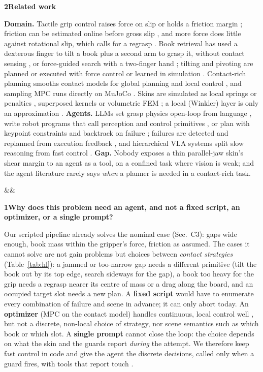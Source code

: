 \documentclass[10pt]{article}
\newcommand{\tplsec}[3]{\par\vspace{7pt}\noindent\colorbox{tplband}{\parbox{\dimexpr\linewidth-2\fboxsep}{%
  \vspace{2pt}{\color{tplorange}\large\bfseries #1}\hspace{0.5em}{\large\bfseries #2}%
  \ifx&#3&\else\\[-1pt]{\small\itshape\color{ink2}#3}\fi\vspace{2pt}}}\par\vspace{3pt}}
\newcommand{\tplq}[2]{\par\vspace{3pt}\noindent\colorbox{tplrow}{\parbox{\dimexpr\linewidth-2\fboxsep}{%
  {\color{tplorange}\bfseries #1}\hspace{0.45em}\textbf{#2}}}\par\vspace{1pt}}
\begin{document}
\tplq{2}{Related work}
\textbf{Domain.} Tactile grip control raises force on slip or holds a friction margin
\cite{romano2011,dong2017,dong2019maintaining,su2015force}; friction can be estimated online before gross slip
\cite{khamis2021friction}, and more force does little against rotational slip, which calls for a regrasp
\cite{kolamuri2021rotation}. Book retrieval has used a dexterous finger to tilt a book plus a second arm to grasp it,
without contact sensing \cite{wieczorek2022trixi}, or force-guided search with a two-finger hand \cite{prats2008uji};
tilting and pivoting are planned or executed with force control \cite{hou2019pivot,hou2019hybrid} or learned in
simulation \cite{zhou2022ungraspable}. Contact-rich planning smooths contact models for global planning and local
control \cite{pang2023tro,suh2025ctr,suh2025thesis}, and sampling MPC runs directly on MuJoCo
\cite{howell2022mjpc,li2025judo}. Skins are simulated as local springs or penalties \cite{tacsl2025,elandt2019},
superposed kernels \cite{taxim2021} or volumetric FEM \cite{difftactile2024}; a local (Winkler) layer is only an
approximation \cite{johnson1985,chandler_vella2020}.
\textbf{Agents.} LLMs set grasp physics open-loop from language \cite{xie2024deligrasp}, write robot programs that call
perception and control primitives \cite{liang2023cap}, or plan with keypoint constraints and backtrack on failure
\cite{huang2024rekep}; failures are detected and replanned from execution feedback \cite{guo2024doremi,liu2023reflect},
and hierarchical VLA systems split slow reasoning from fast control \cite{shi2025hirobot,xue2025rdp}.
\textbf{Gap.} Nobody exposes a thin parallel-jaw skin's shear margin to an agent as a tool, on a confined task where
vision is weak; and the agent literature rarely says \emph{when} a planner is needed in a contact-rich task.

\tplsec{B}{Why an agent}{}
\tplq{1}{Why does this problem need an agent, and not a fixed script, an optimizer, or a single prompt?}
Our scripted pipeline already solves the nominal case (Sec.~C3): gaps wide enough, book mass within the gripper's
force, friction as assumed. The cases it cannot solve are not gain problems but choices between \emph{contact
strategies} (Table~\ref{tab:hl}): a jammed or too-narrow gap needs a different primitive (tilt the book out by its top
edge, search sideways for the gap), a book too heavy for the grip needs a regrasp nearer its centre of mass or a drag
along the board, and an occupied target slot needs a new plan. A \textbf{fixed script} would have to enumerate every
combination of failure and scene in advance; it can only abort today. An \textbf{optimizer} (MPC on the contact
model) handles continuous, local control well \cite{pang2023tro,li2025judo}, but not a discrete, non-local choice of
strategy, nor scene semantics such as which book or which slot. A \textbf{single prompt} cannot close the loop: the
choice depends on what the skin and the guards report \emph{during} the attempt. We therefore keep fast control in
code and give the agent the discrete decisions, called only when a guard fires, with tools that report touch
\cite{liang2023cap,guo2024doremi,huang2024rekep}.
\end{document}
